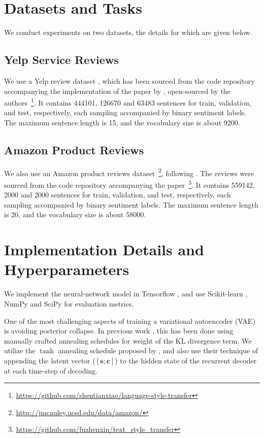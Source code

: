 \section{Datasets and Tasks} \label{sec:datasets-tasks}

We conduct experiments on two datasets, the details for which are given below.

\subsection{Yelp Service Reviews}

We use a Yelp review dataset \citep{challenge2013yelp}, which has been sourced from the code repository accompanying the implementation of the paper by \cite{shen2017style}, open-sourced by the authors~\footnote{\url{https://github.com/shentianxiao/language-style-transfer}}. It contains 444101, 126670 and 63483 sentences for train, validation, and test, respectively, each sampling accompanied by binary sentiment labels. The maximum sentence length is 15, and the vocabulary size is about 9200.

\subsection{Amazon Product Reviews}

We also use an Amazon product reviews dataset~\footnote{\url{http://jmcauley.ucsd.edu/data/amazon/}}, following \cite{fu2017style}. The reviews were sourced from the code repository accompanying the paper~\footnote{\url{https://github.com/fuzhenxin/text_style_transfer}}. It contains 559142, 2000 and 2000 sentences for train, validation, and test, respectively, each sampling accompanied by binary sentiment labels. The maximum sentence length is 20, and the vocabulary size is about 58000.


\section{Implementation Details and Hyperparameters}

We implement the neural-network model in Tensorflow \citep{abadi2016tensorflow}, and use Scikit-learn \citep{pedregosa2011scikit}, NumPy and SciPy for evaluation metrics.

One of the most challenging aspects of training a variational autoencoder (VAE) is avoiding posterior collapse. In previous work \citep{yang2017improved, bowman2016generating, bahuleyan2017variational}, this has been done using manually crafted annealing schedules for weight of the KL divergence term. We utilize the $\tanh$ annealing schedule proposed by \cite{bahuleyan2017variational}, and also use their technique of appending the latent vector ($[\bm s; \bm c]$) to the hidden state of the recurrent decoder at each time-step of decoding.

